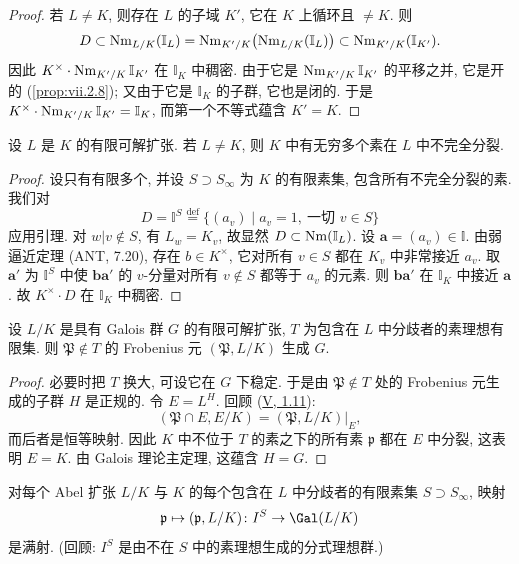 \begin{proof}
若 $L\ne K$, 则存在 $L$ 的子域 $K'$, 它在 $K$ 上循环且 $\ne K$. 则
\[
D\subset\operatorname{Nm}_{L/K}(\mathbb{I}_{L})=\operatorname{Nm}_{K'/K}\bigl(\operatorname{Nm}_{L/K}(\mathbb{I}_{L})\bigr)\subset\operatorname{Nm}_{K'/K}(\mathbb{I}_{K'}).
\]
因此 $K^{\times}\cdot\operatorname{Nm}_{K'/K}\mathbb{I}_{K'}$ 在 $\mathbb{I}_K$ 中稠密. 由于它是 $\operatorname{Nm}_{K'/K}\mathbb{I}_{K'}$ 的平移之并, 它是开的 (\ref{prop:vii.2.8}); 又由于它是 $\mathbb{I}_K$ 的子群, 它也是闭的. 于是 $K^{\times}\cdot\operatorname{Nm}_{K'/K}\mathbb{I}_{K'}=\mathbb{I}_K$, 而第一个不等式蕴含 $K'=K$.
\end{proof}

\begin{proposition}\label{prop:vii.4.6}
设 $L$ 是 $K$ 的有限可解扩张. 若 $L\ne K$, 则 $K$ 中有无穷多个素在 $L$ 中不完全分裂.
\end{proposition}

\begin{proof}
设只有有限多个, 并设 $S\supset S_{\infty}$ 为 $K$ 的有限素集, 包含所有不完全分裂的素. 我们对
\[
D=\mathbb{I}^{S}\overset{\mathrm{def}}{=}\{(a_{v})\mid a_{v}=1,\ \text{一切 }v\in S\}
\]
应用引理. 对 $w|v\notin S$, 有 $L_w=K_v$, 故显然 $D\subset\operatorname{Nm}(\mathbb{I}_L)$. 设 $\mathbf{a}=(a_v)\in\mathbb{I}$. 由弱逼近定理 (ANT, 7.20), 存在 $b\in K^{\times}$, 它对所有 $v\in S$ 都在 $K_v$ 中非常接近 $a_v$. 取 $\mathbf{a}'$ 为 $\mathbb{I}^{S}$ 中使 $\mathbf{b}\mathbf{a}'$ 的 $v$-分量对所有 $v\notin S$ 都等于 $a_v$ 的元素. 则 $\mathbf{b}\mathbf{a}'$ 在 $\mathbb{I}_K$ 中接近 $\mathbf{a}$. 故 $K^{\times}\cdot D$ 在 $\mathbb{I}_K$ 中稠密.
\end{proof}

\begin{proposition}\label{prop:vii.4.7}
设 $L/K$ 是具有 Galois 群 $G$ 的有限可解扩张, $T$ 为包含在 $L$ 中分歧者的素理想有限集. 则 $\mathfrak{P}\notin T$ 的 Frobenius 元 $(\mathfrak{P},L/K)$ 生成 $G$.
\end{proposition}

\begin{proof}
必要时把 $T$ 换大, 可设它在 $G$ 下稳定. 于是由 $\mathfrak{P}\notin T$ 处的 Frobenius 元生成的子群 $H$ 是正规的. 令 $E=L^{H}$. 回顾 (\hyperlink{item:v.1.11}{V, 1.11}):
\[
(\mathfrak{P}\cap E,E/K)=(\mathfrak{P},L/K)\big|_{E},
\]
而后者是恒等映射. 因此 $K$ 中不位于 $T$ 的素之下的所有素 $\mathfrak{p}$ 都在 $E$ 中分裂, 这表明 $E=K$. 由 Galois 理论主定理, 这蕴含 $H=G$.
\end{proof}

\begin{corollary}\label{cor:vii.4.8}
对每个 Abel 扩张 $L/K$ 与 $K$ 的每个包含在 $L$ 中分歧者的有限素集 $S\supset S_{\infty}$, 映射
\[
\mathfrak{p}\mapsto(\mathfrak{p},L/K)\colon I^{S}\to\Gal(L/K)
\]
是满射. (回顾: $I^{S}$ 是由不在 $S$ 中的素理想生成的分式理想群.)
\end{corollary}

